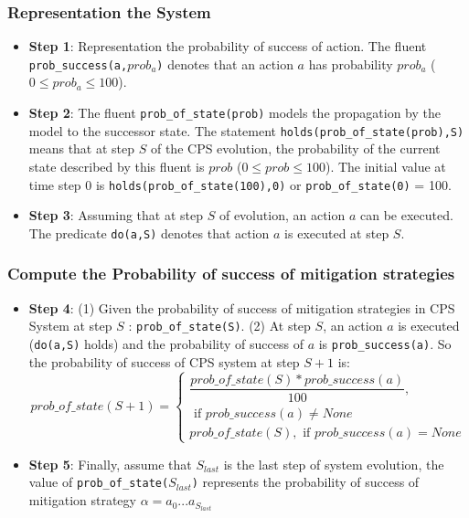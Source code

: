 \documentclass{beamer}
\begin{document}
\begin{frame}[fragile]
	\frametitle{Representation the System}
	\begin{itemize}
		\item {\bf Step 1}: Representation the probability of success of action. The fluent {\tt prob\_success(a,$prob_a$)} denotes that an action $a$ has probability $prob_a$ ($0 \leq prob_a \leq 100$).
		\item {\bf Step 2}: The fluent {\tt prob\_of\_state(prob)} models the propagation by the model to the successor state. The statement {\tt holds(prob\_of\_state(prob),S)} means that at step $S$ of the CPS evolution, the probability of the current state described by this fluent is $prob$ ($0 \leq prob \leq 100$). The initial value at time step 0 is {\tt holds(prob\_of\_state(100),0)} or {\tt prob\_of\_state(0)} = 100.
		\item {\bf Step 3}: Assuming that at step $S$ of evolution, an action $a$ can be executed. The predicate {\tt do(a,S)} denotes that action $a$ is executed at step $S$.
	\end{itemize}
\end{frame}

\begin{frame}[fragile]
	\frametitle{Compute the Probability of success of mitigation strategies}
	\begin{itemize}
		\item {\bf Step 4}: (1) Given the probability of success of mitigation strategies in CPS System at step $S$ : {\tt prob\_of\_state(S)}. (2) At step $S$, an action $a$ is executed ({\tt do(a,S)} holds) and the probability of success of $a$ is {\tt prob\_success(a)}. So the probability of success of CPS system at step $S + 1$ is:
		$$
			prob\_of\_state(S+1) = 
			\begin{cases}
			\dfrac{prob\_of\_state(S)*prob\_success(a)}{100}, \\ \text{ if } prob\_success(a) \neq None \\
			prob\_of\_state(S), \text{ if } prob\_success(a) = None 
			\end{cases} 
		$$
		\item {\bf Step 5}: Finally, assume that $S_{last}$ is the last step of system evolution, the value of {\tt prob\_of\_state($S_{last}$)} represents the probability of success of mitigation strategy $\alpha = a_0...a_{S_{last}}$
	
	\end{itemize}
\end{frame}

%


        
\end{document}
